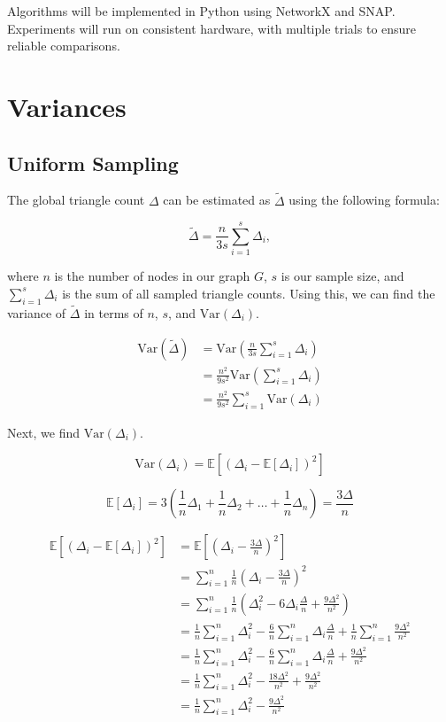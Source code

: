 \documentclass[11pt]{article}
\begin{document}
Algorithms will be implemented in Python using NetworkX and SNAP.
Experiments will run on consistent hardware, with multiple trials to ensure reliable comparisons.

\newpage

\section{Variances}

\subsection{Uniform Sampling}

The global triangle count $\Delta$ can be estimated as $\tilde{\Delta}$ using the following formula:

\[
\tilde{\Delta} = \frac{n}{3s} \sum_{i = 1}^{s} \Delta_i,
\]

where $n$ is the number of nodes in our graph $G$, $s$ is our sample size, and $\sum_{i = 1}^{s} \Delta_i$ is the sum of all sampled triangle counts. 
Using this, we can find the variance of $\tilde{\Delta}$ in terms of $n$, $s$, and $\mathrm{Var}(\Delta_i)$.

\[
\begin{aligned}
\mathrm{Var}(\tilde{\Delta}) &= \mathrm{Var} \left( \frac{n}{3s} \sum_{i=1}^{s} \Delta_i \right) \\
&= \frac{n^2}{9s^2} \mathrm{Var} \left( \sum_{i=1}^{s} \Delta_i \right) \\
&= \frac{n^2}{9s^2} \sum_{i=1}^{s} \mathrm{Var}(\Delta_i)
\end{aligned}
\]

Next, we find $\mathrm{Var}(\Delta_i)$.

\[
\mathrm{Var}(\Delta_i) = \mathbb{E}[(\Delta_i - \mathbb{E}[\Delta_i])^2]
\]

\[
\mathbb{E}[\Delta_i] = 3(\frac{1}{n} \Delta_1 + \frac{1}{n} \Delta_2 + \ldots + \frac{1}{n} \Delta_n) = \frac{3\Delta}{n}
\]

\[
\begin{aligned}
\mathbb{E}[(\Delta_i - \mathbb{E}[\Delta_i])^2] &= \mathbb{E}[(\Delta_i - \frac{3\Delta}{n})^2] \\
&= \sum_{i = 1}^{n} \frac{1}{n} (\Delta_i - \frac{3\Delta}{n})^2 \\
&= \sum_{i = 1}^{n} \frac{1}{n} (\Delta_i^2 - 6 \Delta_i \frac{\Delta}{n} + \frac{9\Delta^2}{n^2}) \\
&= \frac{1}{n} \sum_{i = 1}^{n} \Delta_i^2 - \frac{6}{n} \sum_{i = 1}^{n} \Delta_i \frac{\Delta}{n} + \frac{1}{n} \sum_{i = 1}^{n} \frac{9\Delta^2}{n^2} \\
&= \frac{1}{n} \sum_{i = 1}^{n} \Delta_i^2 - \frac{6}{n} \sum_{i = 1}^{n} \Delta_i \frac{\Delta}{n} + \frac{9\Delta^2}{n^2} \\
&= \frac{1}{n} \sum_{i = 1}^{n} \Delta_i^2 - \frac{18\Delta^2}{n^2} + \frac{9\Delta^2}{n^2} \\
&= \frac{1}{n} \sum_{i = 1}^{n} \Delta_i^2 - \frac{9\Delta^2}{n^2}
\end{aligned}
\]
\end{document}
